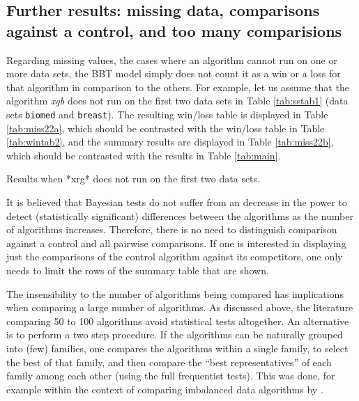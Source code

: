 \documentclass[twoside,11pt,preprint]{article}
\begin{document}
\hypertarget{further-results-missing-data-comparisons-against-a-control-and-too-many-comparisions}{%
\subsection{\texorpdfstring{Further results: missing data, comparisons against a control, and too many comparisions \label{sec:xextra}}{Further results: missing data, comparisons against a control, and too many comparisions }}\label{further-results-missing-data-comparisons-against-a-control-and-too-many-comparisions}}

Regarding missing values, the cases where an algorithm cannot run on
one or more data sets, the BBT model simply does not count it as a win or a
loss for that algorithm in comparison to the others. For example, let us assume that the algorithm \emph{xgb} does not run
on the first two data sets in Table \ref{tab:sstab1} (data sets
\texttt{biomed} and \texttt{breast}). The resulting win/loss table is displayed in Table
\ref{tab:miss22a}, which should be contrasted with the win/loss table in
Table \ref{tab:wintab2}, and the summary results are displayed in
Table \ref{tab:miss22b}, which should be contrasted with the results
in Table \ref{tab:main}.

\begin{table}[ht]
\centering
{}\quad
{}
\caption{Results when *xrg* does not run on the first two data sets.}
\label{tab:miss22}
\end{table}

It is believed that Bayesian tests do not suffer from an decrease in the power to detect (statistically significant) differences between the algorithms as the number of algorithms increases. Therefore, there is no need to distinguish comparison against a control and all pairwise comparisons. If one is interested in displaying just the comparisons of the control algorithm against its competitors, one only needs to limit the rows of the summary table that are shown.

The insensibility to the number of algorithms being compared has implications when comparing a large number of algorithms. As discussed above, the literature comparing 50 to 100 algorithms avoid statistical tests altogether. An alternative is to perform a two step procedure. If the algorithms can be naturally grouped into (few) families, one compares the algorithms within a single family, to select the best of that family, and then compare the ``best representatives'' of each family among each other (using the full frequentist tests). This was done, for example within the context of comparing imbalanced data algorithms by \citet{lopez2013insight}.
\end{document}
